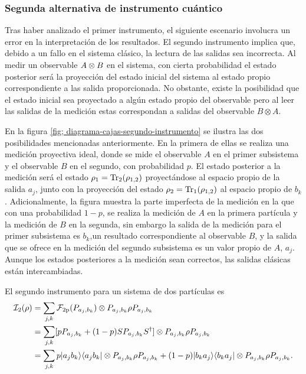 \subsubsection{Segunda alternativa de instrumento cuántico} %

Tras haber analizado el primer instrumento, el siguiente escenario involucra un
error en la interpretación de los resultados. El segundo instrumento implica
que, debido a un fallo en el sistema clásico, la lectura de las salidas sea
incorrecta. Al medir un observable ${A \otimes B}$ en el sistema, con cierta
probabilidad el estado posterior será la proyección del estado inicial del
sistema al estado propio correspondiente a las salida proporcionada. No
obstante, existe la posibilidad que el estado inicial sea proyectado a algún
estado propio del observable pero al leer las salidas de la medición estas
correspondan a salidas del observable $B\otimes A$.

En la figura {\ref{fig; diagrama-cajas-segundo-instrumento}} se ilustra las dos
posibilidades mencionadas anteriormente. En la primera de ellas se realiza una
medición proyectiva ideal, donde se mide el observable $A$ en el primer
subsistema y el observable $B$ en el segundo, con probabilidad $p$. El estado
posterior a la medición será el estado $\rho_1={\rm Tr}_2(\rho_{1,2})$ proyectándose
al espacio propio de la salida $a_j$, junto con la proyección del estado
$\rho_2={\rm Tr}_1(\rho_{1,2})$ al espacio propio de $b_k$. Adicionalmente, la
figura muestra la parte imperfecta de la medición en la que con una
probabilidad $1-p$, se realiza la medición de $A$ en la primera partícula y la
medición de $B$ en la segunda, sin embargo la salida de la medición para el
primer subsistema es $b_k$,un resultado correspondiente al observable $B$, y la
salida que se ofrece en la medición del segundo subsistema es un valor propio
de $A$, $a_j$. Aunque los estados posteriores a la medición sean correctos, las
salidas clásicas están intercambiadas.





El segundo instrumento para un sistema de dos partículas es 
\begin{equation}\label{eq:second-instrument-2p}
    \begin{split}
        \mathcal{I}_2(\rho)&=\sum_{j,k}\mathcal{F}_{2\text{p}}(P_{a_j,b_k})\otimes P_{a_j,b_k} \rho P_{a_j,b_k}\\
        &=\sum_{j,k}[pP_{a_j,b_k}+(1-p)SP_{a_j,b_k}S^\dagger]\otimes P_{a_j,b_k} \rho P_{a_j,b_k}\\
        &=\sum_{j,k} p |a_j b_k\rangle \langle a_j b_k| \otimes P_{a_j,b_k} \rho P_{a_j,b_k}+(1-p)|b_k a_j\rangle \langle b_k a_j|\otimes P_{a_j,b_k} \rho P_{a_j,b_k}.\\
    \end{split}
\end{equation} 



